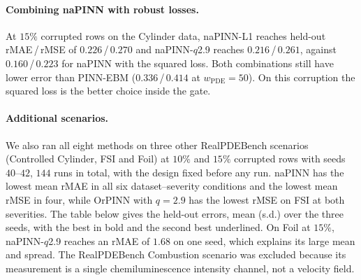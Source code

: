 \documentclass[twoside]{article}
\newcommand{\wpde}{w_{\mathrm{PDE}}}
\begin{document}
\paragraph{Combining naPINN with robust losses.}
At $15\%$ corrupted rows on the Cylinder data, naPINN-L1 reaches held-out
rMAE\,/\,rMSE of $0.226$\,/\,$0.270$ and naPINN-$q$2.9 reaches
$0.216$\,/\,$0.261$, against $0.160$\,/\,$0.223$ for naPINN with the squared
loss. Both combinations still have lower error than PINN-EBM
($0.336$\,/\,$0.414$ at $\wpde = 50$). On this corruption the squared loss is the
better choice inside the gate.

\paragraph{Additional scenarios.}
We also ran all eight methods on three other RealPDEBench scenarios (Controlled
Cylinder, FSI and Foil) at $10\%$ and $15\%$ corrupted rows with seeds
$40$--$42$, $144$ runs in total, with the design fixed before any run. naPINN has the lowest mean rMAE in all six
dataset--severity conditions and the lowest mean rMSE in four, while OrPINN with
$q = 2.9$ has the lowest rMSE on FSI at both severities. The table below gives
the held-out errors, mean (s.d.) over the three seeds, with the best in bold and
the second best underlined. On Foil at $15\%$, naPINN-$q$2.9 reaches an rMAE
of $1.68$ on one seed, which explains its large mean and spread. The RealPDEBench
Combustion scenario was excluded because its measurement is a single
chemiluminescence intensity channel, not a velocity field.
\end{document}
